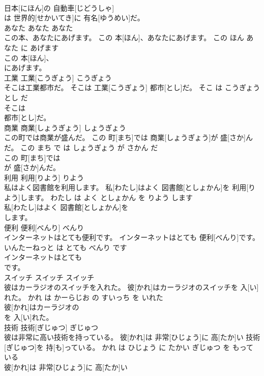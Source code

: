 \documentclass[8pt]{extreport}
\begin{document}
\begin{CJK}{UTF8}{min}
\\	日本[にほん]の 自動車[じどうしゃ]
\\	は 世界的[せかいてき]に 有名[ゆうめい]だ。			
\\	あなた	あなた	あなた	
\\	この本、あなたにあげます。	この 本[ほん]、あなたにあげます。	この ほん あなた に あげます	
\\	この 本[ほん]、
\\	にあげます。			
\\	工業	工業[こうぎょう]	こうぎょう	
\\	そこは工業都市だ。	そこは 工業[こうぎょう] 都市[とし]だ。	そこ は こうぎょう とし だ	
\\	そこは
\\	都市[とし]だ。			
\\	商業	商業[しょうぎょう]	しょうぎょう	
\\	この町では商業が盛んだ。	この 町[まち]では 商業[しょうぎょう]が 盛[さか]んだ。	この まち で は しょうぎょう が さかん だ	
\\	この 町[まち]では
\\	が 盛[さか]んだ。			
\\	利用	利用[りよう]	りよう	
\\	私はよく図書館を利用します。	私[わたし]はよく 図書館[としょかん]を 利用[りよう]します。	わたし は よく としょかん を りよう します	
\\	私[わたし]はよく 図書館[としょかん]を
\\	します。			
\\	便利	便利[べんり]	べんり	
\\	インターネットはとても便利です。	インターネットはとても 便利[べんり]です。	いんたーねっと は とても べんり です	
\\	インターネットはとても
\\	です。			
\\	スイッチ	スイッチ	スイッチ	
\\	彼はカーラジオのスイッチを入れた。	彼[かれ]はカーラジオのスイッチを 入[い]れた。	かれ は かーらじお の すいっち を いれた	
\\	彼[かれ]はカーラジオの
\\	を 入[い]れた。			
\\	技術	技術[ぎじゅつ]	ぎじゅつ	
\\	彼は非常に高い技術を持っている。	彼[かれ]は 非常[ひじょう]に 高[たか]い 技術[ぎじゅつ]を 持[も]っている。	かれ は ひじょう に たかい ぎじゅつ を もって いる	
\\	彼[かれ]は 非常[ひじょう]に 高[たか]い

\end{CJK}
\end{document}
